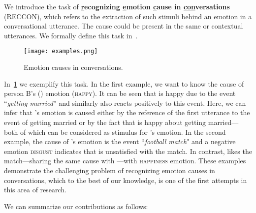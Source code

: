 \documentclass[smallextended]{svjour3}
\newcommand\emo[1]{\textsc{#1}}
\newcommand\0{\hphantom{0}}
\begin{document}
We introduce the task of \textbf{\underline{r}ecognizing \underline{e}motion \underline{c}ause in \underline{con}\-ver\-sa\-tions} (RECCON), which refers to the extraction of such stimuli behind an emotion in a conversational utterance. The cause could be present in the same or contextual utterances.
We formally define this task in~.

\begin{figure}[t] 
    \centering 
    \texttt{[image: examples.png]}
    \caption{Emotion causes in conversations.}
    \label{fig:examples}
\end{figure}

In~\cref{fig:examples} we exemplify this task. In the first example, we want to know the cause of person B's () emotion (\emo{happy}). It can be seen that  is happy due to the event ``\textit{getting married}'' and similarly  also reacts positively to this event. Here, we can infer that 's emotion is caused either by the reference of the first utterance to the event of getting married or by the fact that  is happy about getting married---both of which can be considered as stimulus for 's emotion. In the second example, the cause of 's emotion is the event ``\textit{football match}" and a negative emotion \emo{disgust} indicates that  is unsatisfied 
with
the match. In contrast,  
likes
the match---sharing the same cause with ---with \emo{happiness} emotion. These examples demonstrate the challenging problem of recognizing emotion causes in conversations, which to the best of our knowledge, is one of the first attempts in this area of research.
































We can summarize our contributions as follows:
\end{document}
